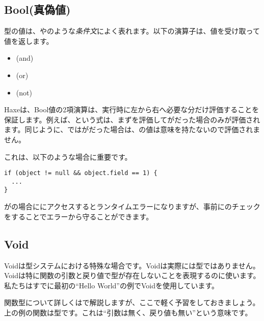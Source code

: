 \subsection{Bool(真偽値)}
\label{types-bool}


型の値は、やのような\emph{条件文}によく表れます。以下の演算子は、値を受け取って値を返します。

\begin{itemize}
	\item \expr{\&\&} (and)
	\item \expr{||} (or)
	\item \expr{!} (not)
\end{itemize}

Haxeは、Bool値の2項演算は、実行時に左から右へ必要な分だけ評価することを保証します。例えば、という式は、まずを評価してがだった場合のみが評価されます。同じように、ではがだった場合は、の値は意味を持たないので評価されません。

これは、以下のような場合に重要です。

\begin{lstlisting}
if (object != null && object.field == 1) {
  ...
}
\end{lstlisting}

がの場合ににアクセスするとランタイムエラーになりますが、事前にのチェックをすることでエラーから守ることができます。

\subsection{Void}
\label{types-void}


Voidは型システムにおける特殊な場合です。Voidは実際には型ではありません。Voidは特に関数の引数と戻り値で型が存在しないことを表現するのに使います。私たちはすでに最初の``Hello World''の例でVoidを使用しています。


関数型について詳しくはで解説しますが、ここで軽く予習をしておきましょう。上の例の関数は型です。これは``引数は無く、戻り値も無い''という意味です。

